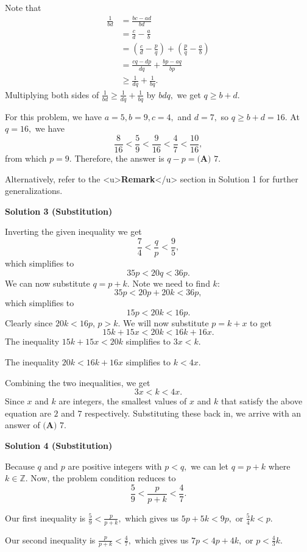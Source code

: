 \begin{enumerate}
 Note that
 \begin{align*} \frac{1}{bd}&=\frac{bc-ad}{bd} \\ &=\frac cd - \frac ab \\ &=\left(\frac cd - \frac pq\right)+\left(\frac pq - \frac ab\right) \\ &=\frac{cq-dp}{dq}+\frac{bp-aq}{bp} \\ &\geq\frac{1}{dq}+\frac{1}{bq}. \end{align*}
Multiplying both sides of $\frac{1}{bd}\geq\frac{1}{dq}+\frac{1}{bq}$ by $bdq,$ we get $q\geq b+d.$

 For this problem, we have $a=5,b=9,c=4,$ and $d=7,$ so $q\geq b+d=16.$ At $q=16,$ we have 
 \[\frac{8}{16}<\frac59<\frac{9}{16}<\frac47<\frac{10}{16},\]from which $p=9.$ Therefore, the answer is $q-p=\boxed{\textbf{(A) } 7}.$

 Alternatively, refer to the <u>\textbf{Remark}</u> section in Solution 1 for further generalizations. 

 



\textbf{Solution 3 (Substitution)}

Inverting the given inequality we get 
 \[\frac{7}{4} < \frac{q}{p} < \frac{9}{5},\]which simplifies to 
 \[35p < 20q < 36p.\]We can now substitute $q = p + k.$ Note we need to find $k:$ 
 \[35p < 20p + 20k < 36p,\]which simplifies to 
 \[15p < 20k < 16p.\]Clearly since $20k < 16p$, $p>k.$ We will now substitute $p = k + x$ to get 
 \[15k + 15x < 20k < 16k + 16x.\]The inequality $15k + 15x < 20k$ simplifies to $3x < k.$

 The inequality $20k < 16k + 16x$ simplifies to $k < 4x.$

 Combining the two inequalities, we get 
 \[3x < k < 4x.\]Since $x$ and $k$ are integers, the smallest values of $x$ and $k$ that satisfy the above equation are $2$ and $7$ respectively. Substituting these back in, we arrive with an answer of $\boxed{\textbf{(A) } 7}.$




\textbf{Solution 4 (Substitution)}

Because $q$ and $p$ are positive integers with $p<q,$ we can let $q=p+k$ where $k\in{\mathbb{Z}}.$ Now, the problem condition reduces to 
 \[\frac{5}{9}<\frac{p}{p+k}<\frac{4}{7}.\]

 Our first inequality is $\frac{5}{9}<\frac{p}{p+k},$ which gives us $5p+5k<9p,$ or $\frac{5}{4}k<p.$

 Our second inequality is $\frac{p}{p+k}<\frac{4}{7},$ which gives us $7p<4p+4k,$ or $p<\frac{4}{3}k.$


\end{enumerate}
